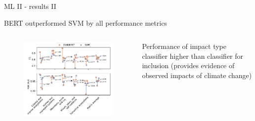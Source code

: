 \documentclass[9pt]{beamer}
\begin{document}
\begin{frame}{ML II - results II}

BERT outperformed SVM by all performance metrics

\begin{columns}
	\begin{column}{0.618\linewidth}
		\begin{figure}
			\includegraphics[width=\linewidth]{../figures/SI_figure_4.pdf}
		\end{figure}
	\end{column}
	
	\begin{column}{0.382\linewidth}
			Performance of impact type classifier higher than classifier for inclusion (provides evidence of observed impacts of climate change)
	\end{column}
\end{columns}



\end{frame}
\end{document}
